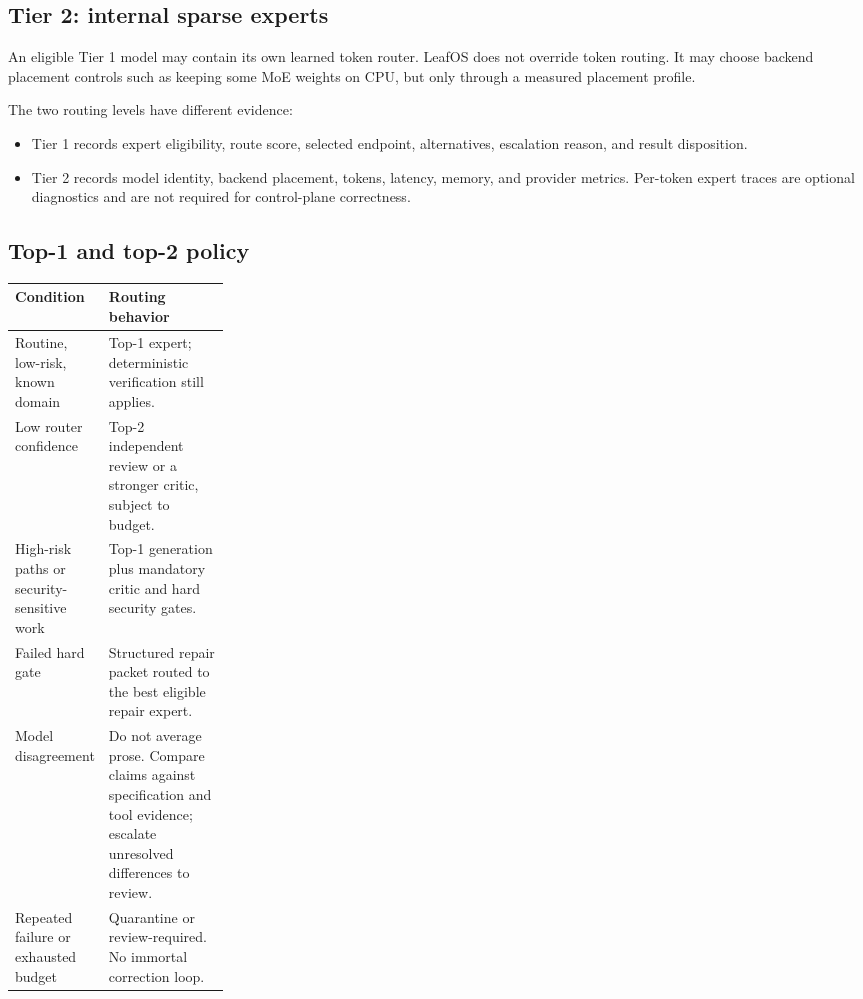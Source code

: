 \documentclass[11pt,letterpaper]{article}
\begin{document}
\subsection{Tier 2: internal sparse experts}

An eligible Tier 1 model may contain its own learned token router. LeafOS does
not override token routing. It may choose backend placement controls such as
keeping some MoE weights on CPU, but only through a measured placement profile.

The two routing levels have different evidence:

\begin{itemize}
  \item Tier 1 records expert eligibility, route score, selected endpoint,
        alternatives, escalation reason, and result disposition.
  \item Tier 2 records model identity, backend placement, tokens, latency,
        memory, and provider metrics. Per-token expert traces are optional
        diagnostics and are not required for control-plane correctness.
\end{itemize}

\subsection{Top-1 and top-2 policy}

\begin{tabularx}{\linewidth}{@{}L{0.25\linewidth}Y@{}}
\toprule
\textbf{Condition} & \textbf{Routing behavior} \\
\midrule
Routine, low-risk, known domain &
Top-1 expert; deterministic verification still applies. \\
Low router confidence &
Top-2 independent review or a stronger critic, subject to budget. \\
High-risk paths or security-sensitive work &
Top-1 generation plus mandatory critic and hard security gates. \\
Failed hard gate &
Structured repair packet routed to the best eligible repair expert. \\
Model disagreement &
Do not average prose. Compare claims against specification and tool evidence;
escalate unresolved differences to review. \\
Repeated failure or exhausted budget &
Quarantine or review-required. No immortal correction loop. \\
\bottomrule
\end{tabularx}
\end{document}
